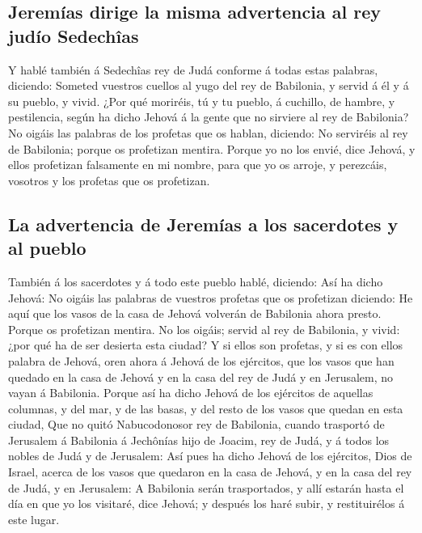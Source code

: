 \hypertarget{jeremuxedas-dirige-la-misma-advertencia-al-rey-juduxedo-sedechuxeeas}{%
\subsection{Jeremías dirige la misma advertencia al rey judío
Sedechîas}\label{jeremuxedas-dirige-la-misma-advertencia-al-rey-juduxedo-sedechuxeeas}}

 Y hablé también á Sedechîas rey de Judá conforme á todas
estas palabras, diciendo: Someted vuestros cuellos al yugo del rey de
Babilonia, y servid á él y á su pueblo, y vivid.  ¿Por qué
moriréis, tú y tu pueblo, á cuchillo, de hambre, y pestilencia, según ha
dicho Jehová á la gente que no sirviere al rey de Babilonia?
 No oigáis las palabras de los profetas que os hablan,
diciendo: No serviréis al rey de Babilonia; porque os profetizan
mentira.  Porque yo no los envié, dice Jehová, y ellos
profetizan falsamente en mi nombre, para que yo os arroje, y perezcáis,
vosotros y los profetas que os profetizan.

\hypertarget{la-advertencia-de-jeremuxedas-a-los-sacerdotes-y-al-pueblo}{%
\subsection{La advertencia de Jeremías a los sacerdotes y al
pueblo}\label{la-advertencia-de-jeremuxedas-a-los-sacerdotes-y-al-pueblo}}

 También á los sacerdotes y á todo este pueblo hablé,
diciendo: Así ha dicho Jehová: No oigáis las palabras de vuestros
profetas que os profetizan diciendo: He aquí que los vasos de la casa de
Jehová volverán de Babilonia ahora presto. Porque os profetizan mentira.
 No los oigáis; servid al rey de Babilonia, y vivid: ¿por
qué ha de ser desierta esta ciudad?  Y si ellos son
profetas, y si es con ellos palabra de Jehová, oren ahora á Jehová de
los ejércitos, que los vasos que han quedado en la casa de Jehová y en
la casa del rey de Judá y en Jerusalem, no vayan á Babilonia.
 Porque así ha dicho Jehová de los ejércitos de aquellas
columnas, y del mar, y de las basas, y del resto de los vasos que quedan
en esta ciudad,  Que no quitó Nabucodonosor rey de
Babilonia, cuando trasportó de Jerusalem á Babilonia á Jechônías hijo de
Joacim, rey de Judá, y á todos los nobles de Judá y de Jerusalem:
 Así pues ha dicho Jehová de los ejércitos, Dios de Israel,
acerca de los vasos que quedaron en la casa de Jehová, y en la casa del
rey de Judá, y en Jerusalem:  A Babilonia serán
trasportados, y allí estarán hasta el día en que yo los visitaré, dice
Jehová; y después los haré subir, y restituirélos á este lugar.

